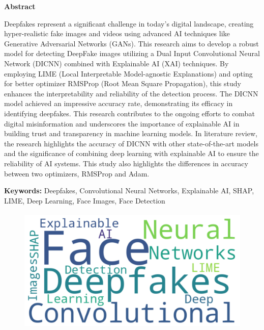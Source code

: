 \pagestyle{plain}
\vspace*{52pt}
\begin{center}
    \large{\textbf{Abstract}}\\[31pt]
\end{center}

Deepfakes represent a significant challenge in today's digital landscape, creating hyper-realistic fake images and videos using advanced AI techniques like Generative Adversarial Networks (GANs). This research aims to develop a robust model for detecting DeepFake images utilizing a Dual Input Convolutional Neural Network (DICNN) combined with Explainable AI (XAI) techniques. 
By employing LIME (Local Interpretable Model-agnostic Explanations) and opting for better optimizer RMSProp (Root Mean Square Propagation), this study enhances the interpretability and reliability of the detection process. 
The DICNN model achieved an impressive accuracy rate, demonstrating its efficacy in identifying deepfakes. 
This research contributes to the ongoing efforts to combat digital misinformation and underscores the importance of explainable AI in building trust and transparency in machine learning models.
In literature review, the research highlights the accuracy of DICNN with other state-of-the-art models and the significance of combining deep learning with explainable AI to ensure the reliability of AI systems.
This study also highlights the differences in accuracy between two optimizers, RMSProp and Adam. 


\begin{flushleft}
    \textbf{Keywords:} Deepfakes, Convolutional Neural Networks, Explainable AI, SHAP, LIME, Deep Learning, Face Images, Face Detection
\end{flushleft}

\begin{figure}[H]
    \centering
    \includegraphics[height=6cm]{images/wordcloud.png}
    \label{fig:wordcloud}
 \end{figure}

